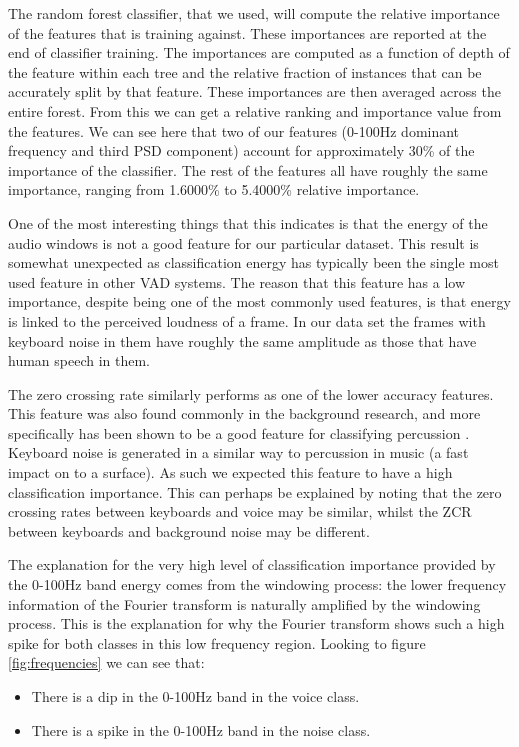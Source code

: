 \documentclass[ %
                    author={Sam Phippen},
                supervisor={Dr. Rafal Bogacz},
                     title={Real time voice activity detectors in noisy personal computing environments},
                  subtitle={},
                    degree={MEng},
                      year={2012} ]{thesis}
\begin{document}
The random forest classifier, that we used, will compute the relative
importance of the features that is training against. These importances are
reported at the end of classifier training. The importances are computed as a
function of depth of the feature within each tree and the relative fraction of
instances that can be accurately split by that feature. These importances are
then averaged across the entire forest. From this we can get a relative ranking
and importance value from the features. We can see here that two of our
features (0-100Hz dominant frequency and third PSD component) account for
approximately 30\% of the importance of the classifier. The rest of the
features all have roughly the same importance, ranging from 1.6000\% to
5.4000\% relative importance.

One of the most interesting things that this indicates is that the energy of
the audio windows is not a good feature for our particular dataset. This result
is somewhat unexpected as classification energy has typically been the single
most used feature in other VAD systems. The reason that this feature has a low
importance, despite being one of the most commonly used features, is that
energy is linked to the perceived loudness of a frame. In our data set the
frames with keyboard noise in them have roughly the same amplitude as those
that have human speech in them.

The zero crossing rate similarly performs as one of the lower accuracy
features. This feature was also found commonly in the background research, and
more specifically has been shown to be a good feature for classifying
percussion \cite{gouyon}. Keyboard noise is generated in a similar way to
percussion in music (a fast impact on to a surface). As such we expected this
feature to have a high classification importance. This can perhaps be explained
by noting that the zero crossing rates between keyboards and voice may be
similar, whilst the ZCR between keyboards and background noise may be
different.

The explanation for the very high level of classification importance provided
by the 0-100Hz band energy comes from the windowing process: the lower
frequency information of the Fourier transform is naturally amplified by the
windowing process. This is the explanation for why the Fourier transform shows
such a high spike for both classes in this low frequency region. Looking to
figure \ref{fig:frequencies} we can see that:

\begin{itemize}

    \item There is a dip in the 0-100Hz band in the voice class.

    \item There is a spike in the 0-100Hz band in the noise class.

\end{itemize}
\end{document}
